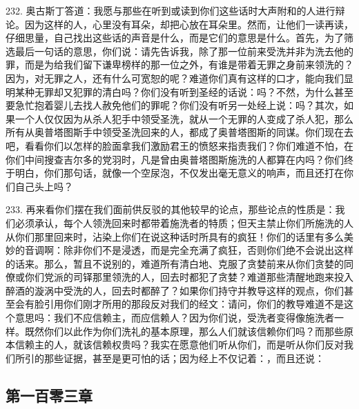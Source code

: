 232. 奥古斯丁答道：我愿与那些在听到或读到你们这些话时大声附和的人进行辩论。因为这样的人，心里没有耳朵，却把心放在耳朵里。然而，让他们一读再读，仔细思量，自己找出这些话的声音是什么，而是它们的意思是什么。首先，为了筛选最后一句话的意思，你们说：请先告诉我，除了那一位前来受洗并非为洗去他的罪，而是为给我们留下谦卑榜样的那一位之外，有谁是带着无罪之身前来领洗的？因为，对无罪之人，还有什么可宽恕的呢？难道你们真有这样的口才，能向我们显明某种无罪却又犯罪的清白吗？你们没有听到圣经的话说：吗？不然，为什么甚至要急忙抱着婴儿去找人赦免他们的罪呢？你们没有听另一处经上说：吗？其次，如果一个人仅仅因为从杀人犯手中领受圣洗，就从一个无罪的人变成了杀人犯，那么所有从奥普塔图斯手中领受圣洗回来的人，都成了奥普塔图斯的同谋。你们现在去吧，看看你们以怎样的脸面拿我们激励君王的愤怒来指责我们？你们难道不怕，在你们中间搜查吉尔多的党羽时，凡是曾由奥普塔图斯施洗的人都算在内吗？你们终于明白，你们那句话，就像一个空尿泡，不仅发出毫无意义的响声，而且还打在你们自己头上吗？\par

233. 再来看你们摆在我们面前供反驳的其他较早的论点，那些论点的性质是：我们必须承认，每个人领洗回来时都带着施洗者的特质；但天主禁止你们所施洗的人从你们那里回来时，沾染上你们在说这种话时所具有的疯狂！你们的话里有多么美妙的音调啊：除非你们不是浸透，而是完全充满了疯狂，否则你们绝不会说出这样的话来。那么，暂且不说别的，难道所有清白地、克服了贪婪前来从你们贪婪的同僚或你们党派的司铎那里领洗的人，回去时都犯了贪婪？难道那些清醒地跑来投入醉酒的漩涡中受洗的人，回去时都醉了？如果你们持守并教导这样的观点，你们甚至会有脸引用你们刚才所用的那段反对我们的经文：请问，你们的教导难道不是这个意思吗：我们不应信赖主，而应信赖人？因为你们说，受洗者变得像施洗者一样。既然你们以此作为你们洗礼的基本原理，那么人们就该信赖你们吗？而那些原本信赖主的人，就该信赖权贵吗？我实在愿意他们听从你们，而是听从你们反对我们所引的那些证据，甚至是更可怕的话；因为经上不仅记着：，而且还说：\par


\subsection{第一百零三章}

